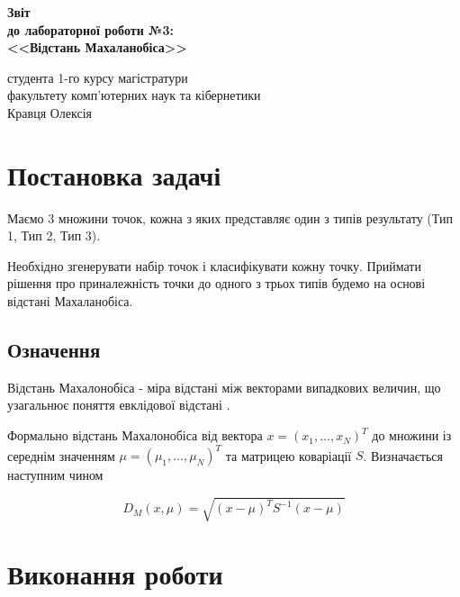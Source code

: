 \documentclass[a4paper,12pt]{article}
\begin{document}
	
	\begin{titlepage}
		\vspace*{6cm}
		\begin{center}
			
			\large
			\textbf{Звіт}\\
			\textbf{до лабораторної роботи №3:}\\
			\textbf{<<Відстань Махаланобіса>>}
			
		\end{center}
		
		\vspace{8cm}
		\begin{flushright}
			студента 1-го курсу магістратури\\
			факультету комп'ютерних наук та кібернетики\\
			Кравця Олексія
		\end{flushright}
		
	\end{titlepage}

\newpage
\tableofcontents
\newpage
\section{Постановка задачі}

Маємо 3 множини точок, кожна з яких представляє один з типів результату (Тип 1, Тип 2, Тип 3).

Необхідно згенерувати набір точок і класифікувати кожну точку. Приймати рішення про приналежність точки до одного з трьох типів будемо на основі відстані Махаланобіса.

\subsection{Означення}

Відстань Махалонобіса - міра відстані між векторами випадкових величин, що узагальнює поняття евклідової відстані \cite{Wiki}.

Формально відстань Махалонобіса від вектора $x= (x_1, \ldots, x_N)^T$ до множини із середнім значенням $\mu = (\mu_1, \ldots, \mu_N)^T$ та матрицею коваріації $S$. Визначається наступним чином

\begin{equation}
	D_M (x, \mu) = \sqrt{(x-\mu)^T S^{-1} (x-\mu)}
\end{equation}

\section{Виконання роботи}
\end{document}
